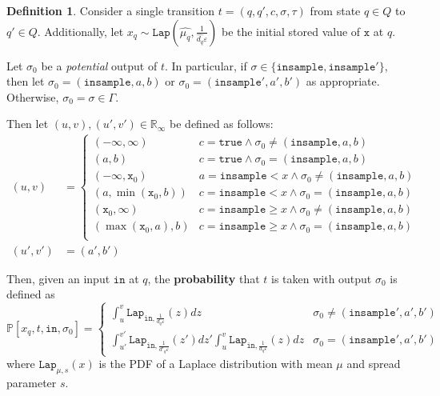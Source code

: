 \documentclass[12pt]{article}
\newcommand{\RR}{\mathbb{R}}
\newcommand{\PP}{\mathbb{P}}
\newcommand{\gguard}[1][x]{\texttt{insample}\geq #1}
\newcommand{\lguard}[1][x]{\texttt{insample} < #1}
\newcommand{\Lap}{\texttt{Lap}}
\theoremstyle{definition}
\newtheorem{defn}[thm]{Definition}
\begin{document}
\begin{defn}
    Consider a single transition $t=(q, q', c, \sigma, \tau)$ from state $q\in Q$ to $q'\in Q$. Additionally, let $x_q\sim \Lap(\hat{\mu_q}, \frac{1}{\hat{d_q}\varepsilon})$ be the initial stored value of $\texttt{x}$ at $q$. 

    Let $\sigma_0$ be a \textit{potential} output of $t$. In particular, if $\sigma\in \{\texttt{insample}, \texttt{insample}'\}$, then let $\sigma_0 = (\texttt{insample}, a, b)$ or $\sigma_0 = (\texttt{insample}', a', b')$ as appropriate. Otherwise, $\sigma_0 = \sigma\in \Gamma$. 
    
    Then let $(u, v), (u', v')\in \RR_{\infty}$ be defined as follows:
    \begin{align*}
        (u, v) &= \begin{cases}
        (-\infty, \infty) & c=\texttt{true}\land \sigma_0 \neq (\texttt{insample}, a, b)\\
        (a, b) &c=\texttt{true}\land \sigma_0 = (\texttt{insample}, a, b)\\
        (-\infty, \texttt{x}_0) & a=\lguard\land \sigma_0 \neq (\texttt{insample}, a, b)\\
        (a, \min(\texttt{x}_0, b)) &c=\lguard\land \sigma_0 = (\texttt{insample}, a, b)\\
        (\texttt{x}_0, \infty) & c=\gguard\land \sigma_0 \neq (\texttt{insample}, a, b)\\
        (\max(\texttt{x}_0, a),b) &c=\gguard\land \sigma_0 = (\texttt{insample}, a, b)\\
    \end{cases}\\
    (u', v')& = (a', b')\end{align*}

    Then, given an input $\texttt{in}$ at $q$, the \textbf{probability} that $t$ is taken with output $\sigma_0$ is defined as \[
        \PP[x_q, t, \texttt{in}, \sigma_0] = \begin{cases}
            \int_u^v \Lap_{\texttt{in}, \frac{1}{d_q\varepsilon}}(z)dz & \sigma_0 \neq (\texttt{insample}', a', b') \\
            \int_{u'}^{v'}\Lap_{\texttt{in}, \frac{1}{d'_q\varepsilon}}(z')dz'\int_u^v \Lap_{\texttt{in}, \frac{1}{d_q\varepsilon}}(z)dz& \sigma_0 = (\texttt{insample}', a', b')
        \end{cases}
    \]
    where $\Lap_{\mu, s}(x)$ is the PDF of a Laplace distribution with mean $\mu$ and spread parameter $s$.
\end{defn}
\end{document}

